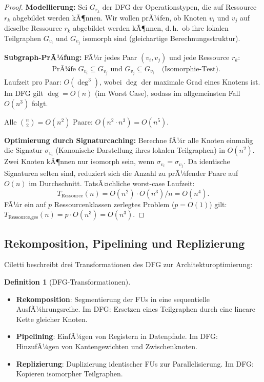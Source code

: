﻿\documentclass[a4paper,12pt]{article}
\theoremstyle{definition}
\newtheorem{definition}{Definition}
\begin{document}
\begin{proof}
  \textbf{Modellierung:} Sei $G_{r_k}$ der DFG der Operationstypen, die auf Ressource
  $r_k$ abgebildet werden kÃ¶nnen. Wir wollen prÃ¼fen, ob Knoten $v_i$ und $v_j$ auf
  dieselbe Ressource $r_k$ abgebildet werden kÃ¶nnen, d.\,h.\ ob ihre lokalen
  Teilgraphen $G_{v_i}$ und $G_{v_j}$ isomorph sind (gleichartige Berechnungsstruktur).

  \textbf{Subgraph-PrÃ¼fung:} FÃ¼r jedes Paar $(v_i, v_j)$ und jede Ressource $r_k$:
  \begin{align*}
    &\text{PrÃ¼fe } G_{v_i} \subseteq G_{v_j} \text{ und } G_{v_j} \subseteq G_{v_i}
    \quad \text{(Isomorphie-Test)}.
  \end{align*}
  Laufzeit pro Paar: $O(\deg^3)$, wobei $\deg$ der maximale Grad eines Knotens ist.
  Im DFG gilt $\deg = O(n)$ (im Worst Case), sodass im allgemeinsten Fall $O(n^3)$ folgt.

  Alle $\binom{n}{2} = O(n^2)$ Paare: $O(n^2 \cdot n^3) = O(n^5)$.

  \textbf{Optimierung durch Signaturcaching:} Berechne fÃ¼r alle Knoten einmalig die
  Signatur $\sigma_{v_i}$ (Kanonische Darstellung ihres lokalen Teilgraphen) in $O(n^2)$.
  Zwei Knoten kÃ¶nnen nur isomorph sein, wenn $\sigma_{v_i} = \sigma_{v_j}$. Da
  identische Signaturen selten sind, reduziert sich die Anzahl zu prÃ¼fender Paare
  auf $O(n)$ im Durchschnitt. TatsÃ¤chliche worst-case Laufzeit:
  \[
    T_{\text{Ressource}}(n) = O(n^2) \cdot O(n^3) / n = O(n^4).
  \]
  FÃ¼r ein auf $p$ Ressourcenklassen zerlegtes Problem ($p = O(1)$) gilt:
  $T_{\text{Ressource,ges}}(n) = p \cdot O(n^3) = O(n^3)$.
\end{proof}

\subsection{Rekomposition, Pipelining und Replizierung}

Ciletti \cite[S.~576]{ciletti2011} beschreibt drei Transformationen des DFG zur
Architekturoptimierung:

\begin{definition}[DFG-Transformationen]
  \begin{itemize}
    \item \textbf{Rekomposition}: Segmentierung der FUs in eine sequentielle AusfÃ¼hrungsreihe.
          Im DFG: Ersetzen eines Teilgraphen durch eine lineare Kette gleicher Knoten.
    \item \textbf{Pipelining}: EinfÃ¼gen von Registern in Datenpfade. Im DFG: HinzufÃ¼gen
          von Kantengewichten und Zwischenknoten.
    \item \textbf{Replizierung}: Duplizierung identischer FUs zur Parallelisierung.
          Im DFG: Kopieren isomorpher Teilgraphen.
  \end{itemize}
\end{definition}
\end{document}
